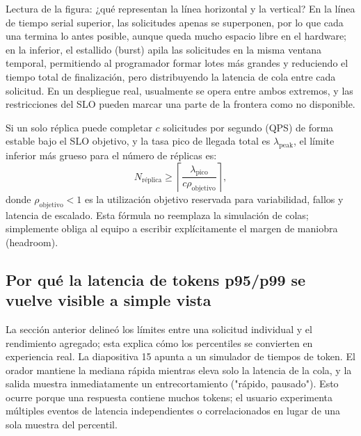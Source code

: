 
\begin{knowledgebox}{Lectura de la figura: ¿qué representan la línea horizontal y la vertical?}
En la línea de tiempo serial superior, las solicitudes apenas se superponen, por lo que cada una termina lo antes posible, aunque queda mucho espacio libre en el hardware; en la inferior, el estallido (burst) apila las solicitudes en la misma ventana temporal, permitiendo al programador formar lotes más grandes y reduciendo el tiempo total de finalización, pero distribuyendo la latencia de cola entre cada solicitud. En un despliegue real, usualmente se opera entre ambos extremos, y las restricciones del SLO pueden marcar una parte de la frontera como no disponible.
\end{knowledgebox}

Si un solo réplica puede completar $c$ solicitudes por segundo (QPS) de forma estable bajo el SLO objetivo, y la tasa pico de llegada total es $\lambda_{\mathrm{peak}}$, el límite inferior más grueso para el número de réplicas es:
\[
N_{\mathrm{réplica}}\geq \left\lceil\frac{\lambda_{\mathrm{pico}}}{c\rho_{\mathrm{objetivo}}}\right\rceil,
\]
donde $\rho_{\mathrm{objetivo}}<1$ es la utilización objetivo reservada para variabilidad, fallos y latencia de escalado. Esta fórmula no reemplaza la simulación de colas; simplemente obliga al equipo a escribir explícitamente el margen de maniobra (headroom).

\subsection{Por qué la latencia de tokens p95/p99 se vuelve visible a simple vista}

La sección anterior delineó los límites entre una solicitud individual y el rendimiento agregado; esta explica cómo los percentiles se convierten en experiencia real. La diapositiva 15 apunta a un simulador de tiempos de token. El orador mantiene la mediana rápida mientras eleva solo la latencia de la cola, y la salida muestra inmediatamente un entrecortamiento ("rápido, pausado"). Esto ocurre porque una respuesta contiene muchos tokens; el usuario experimenta múltiples eventos de latencia independientes o correlacionados en lugar de una sola muestra del percentil.


